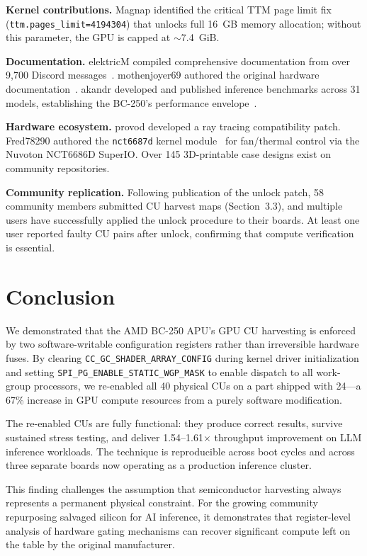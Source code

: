 \documentclass[11pt,twocolumn]{article}
\begin{document}
\textbf{Kernel contributions.}
Magnap identified the critical TTM page limit fix (\texttt{ttm.pages\_limit=4194304}) that unlocks full 16~GB memory allocation; without this parameter, the GPU is capped at $\sim$7.4~GiB.

\textbf{Documentation.}
elektricM compiled comprehensive documentation from over 9,700 Discord messages~\cite{elektric}. mothenjoyer69 authored the original hardware documentation~\cite{mothen}. akandr developed and published inference benchmarks across 31 models, establishing the BC-250's performance envelope~\cite{akandr}.

\textbf{Hardware ecosystem.}
provod developed a ray tracing compatibility patch. Fred78290 authored the \texttt{nct6687d} kernel module~\cite{nct6687d} for fan/thermal control via the Nuvoton NCT6686D SuperIO. Over 145 3D-printable case designs exist on community repositories.

\textbf{Community replication.}
Following publication of the unlock patch, 58 community members submitted CU harvest maps (Section~3.3), and multiple users have successfully applied the unlock procedure to their boards. At least one user reported faulty CU pairs after unlock, confirming that compute verification is essential.

\section{Conclusion}

We demonstrated that the AMD BC-250 APU's GPU CU harvesting is enforced by two software-writable configuration registers rather than irreversible hardware fuses. By clearing \texttt{CC\_GC\_SHADER\_ARRAY\_CONFIG} during kernel driver initialization and setting \texttt{SPI\_PG\_ENABLE\_STATIC\_WGP\_MASK} to enable dispatch to all work-group processors, we re-enabled all 40 physical CUs on a part shipped with 24---a 67\% increase in GPU compute resources from a purely software modification.

The re-enabled CUs are fully functional: they produce correct results, survive sustained stress testing, and deliver 1.54--1.61$\times$ throughput improvement on LLM inference workloads. The technique is reproducible across boot cycles and across three separate boards now operating as a production inference cluster.

This finding challenges the assumption that semiconductor harvesting always represents a permanent physical constraint. For the growing community repurposing salvaged silicon for AI inference, it demonstrates that register-level analysis of hardware gating mechanisms can recover significant compute left on the table by the original manufacturer.
\end{document}
